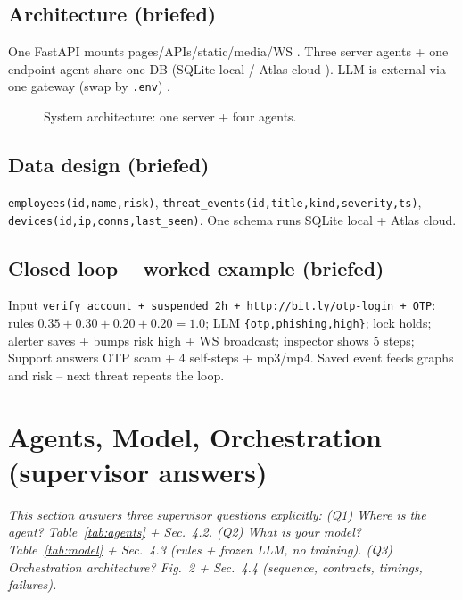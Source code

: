 \documentclass[11pt,a4paper]{article}
\begin{document}
\subsection{Architecture (briefed)}
One FastAPI mounts pages/APIs/static/media/WS \cite{FastAPI24}. Three server agents + one endpoint agent share one DB (SQLite local / Atlas cloud \cite{Mongo24}). LLM is external via one gateway (swap by \texttt{.env}) \cite{Ji25}. 
\begin{figure}[h]\centering{}\caption{System architecture: one server + four agents.}\end{figure}

\subsection{Data design (briefed)}
\texttt{employees(id,name,risk)}, \texttt{threat\_events(id,title,kind,severity,ts)}, \texttt{devices(id,ip,conns,last\_seen)}. One schema runs SQLite local + Atlas cloud.

\subsection{Closed loop -- worked example (briefed)}
Input \texttt{verify account + suspended 2h + http://bit.ly/otp-login + OTP}: rules $0.35+0.30+0.20+0.20=1.0$; LLM \texttt{\{otp,phishing,high\}}; lock holds; alerter saves + bumps risk high + WS broadcast; inspector shows 5 steps; Support answers OTP scam + 4 self-steps + mp3/mp4. Saved event feeds graphs and risk -- next threat repeats the loop.

\section{Agents, Model, Orchestration (supervisor answers)}
\noindent\textit{This section answers three supervisor questions explicitly: (Q1) Where is the agent? Table~\ref{tab:agents} + Sec.~4.2. (Q2) What is your model? Table~\ref{tab:model} + Sec.~4.3 (rules + frozen LLM, no training). (Q3) Orchestration architecture? Fig.~2 + Sec.~4.4 (sequence, contracts, timings, failures).}
\end{document}
